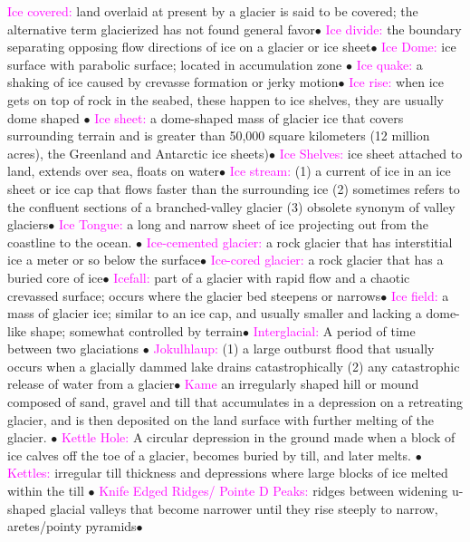 \documentclass{article}
\newcommand{\ddd}{$\bullet$}
\newcommand{\pink}[1]{\textcolor{magenta}{#1}}
\newcommand{\vocab}[1]{{\pink{#1}}}
\begin{document}
\begin{multicols*}{4}
		\vocab{        Ice covered: } land overlaid at present by a glacier is said to be covered; the alternative term glacierized has not found general favor\ddd
		\vocab{        Ice divide: } the boundary separating opposing flow directions of ice on a glacier or ice sheet\ddd
		\vocab{        Ice Dome: } ice surface with parabolic surface; located in accumulation zone \ddd 
		\vocab{        Ice quake: } a shaking of ice caused by crevasse formation or jerky motion\ddd
		\vocab{Ice rise: } when ice gets on top of rock in the seabed, these happen to ice shelves, they are usually dome shaped \ddd
		\vocab{        Ice sheet: } a dome-shaped mass of glacier ice that covers surrounding terrain and is greater than 50,000 square kilometers (12 million acres), the Greenland and Antarctic ice sheets)\ddd
		\vocab{ Ice Shelves: }ice sheet attached to land, extends over sea, floats on water\ddd
		\vocab{        Ice stream: } (1) a current of ice in an ice sheet or ice cap that flows faster than the surrounding ice (2) sometimes refers to the confluent sections of a branched-valley glacier (3) obsolete synonym of valley glaciers\ddd
		\vocab{Ice Tongue: } a long and narrow sheet of ice projecting out from the coastline to the ocean. \ddd
		\vocab{        Ice-cemented glacier: } a rock glacier that has interstitial ice a meter or so below the surface\ddd
		\vocab{        Ice-cored glacier: } a rock glacier that has a buried core of ice\ddd
		\vocab{        Icefall: } part of a glacier with rapid flow and a chaotic crevassed surface; occurs where the glacier bed steepens or narrows\ddd
		\vocab{        Ice field: } a mass of glacier ice; similar to an ice cap, and usually smaller and lacking a dome-like shape; somewhat controlled by terrain\ddd
		\vocab{Interglacial: } A period of time between two glaciations \ddd
		\vocab{        Jokulhlaup: } (1) a large outburst flood that usually occurs when a glacially dammed lake drains catastrophically (2) any catastrophic release of water from a glacier\ddd
		\vocab{Kame} an irregularly shaped hill or mound composed of sand, gravel and till that accumulates in a depression on a retreating glacier, and is then deposited on the land surface with further melting of the glacier. \ddd
		\vocab{Kettle Hole: } A circular depression in the ground made when a block of ice calves off the toe of a glacier, becomes buried by till, and later melts. \ddd
		\vocab{Kettles: } irregular till thickness and depressions where large blocks of ice melted within the till \ddd
		\vocab{Knife Edged Ridges/ Pointe D Peaks: } ridges between widening u-shaped glacial valleys that become narrower until they rise steeply to narrow, aretes/pointy pyramids\ddd

\end{multicols*}
\end{document}
